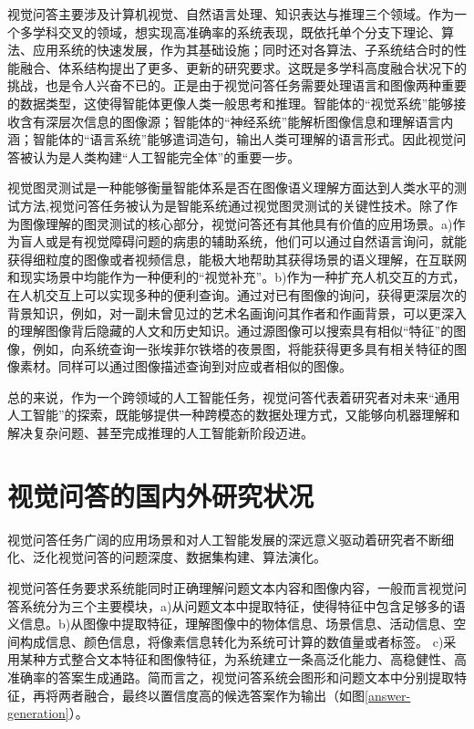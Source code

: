 视觉问答主要涉及计算机视觉、自然语言处理、知识表达与推理三个领域。作为一个多学科交叉的领域，想实现高准确率的系统表现，既依托单个分支下理论、算法、应用系统的快速发展，作为其基础设施；同时还对各算法、子系统结合时的性能融合、体系结构提出了更多、更新的研究要求。这既是多学科高度融合状况下的挑战，也是令人兴奋不已的。正是由于视觉问答任务需要处理语言和图像两种重要的数据类型，这使得智能体更像人类一般思考和推理。智能体的“视觉系统”能够接收含有深层次信息的图像源；智能体的“神经系统”能解析图像信息和理解语言内涵；智能体的“语言系统”能够遣词造句，输出人类可理解的语言形式。因此视觉问答被认为是人类构建“人工智能完全体”的重要一步。

视觉图灵测试是一种能够衡量智能体系是否在图像语义理解方面达到人类水平的测试方法,视觉问答任务被认为是智能系统通过视觉图灵测试的关键性技术。除了作为图像理解的图灵测试的核心部分，视觉问答还有其他具有价值的应用场景。a)作为盲人或是有视觉障碍问题的病患的辅助系统，他们可以通过自然语言询问，就能获得细粒度的图像或者视频信息，能极大地帮助其获得场景的语义理解，在互联网和现实场景中均能作为一种便利的“视觉补充”。b)作为一种扩充人机交互的方式，在人机交互上可以实现多种的便利查询。通过对已有图像的询问，获得更深层次的背景知识，例如，对一副未曾见过的艺术名画询问其作者和作画背景，可以更深入的理解图像背后隐藏的人文和历史知识。通过源图像可以搜索具有相似“特征”的图像，例如，向系统查询一张埃菲尔铁塔的夜景图，将能获得更多具有相关特征的图像素材。同样可以通过图像描述查询到对应或者相似的图像。

总的来说，作为一个跨领域的人工智能任务，视觉问答代表着研究者对未来“通用人工智能”的探索，既能够提供一种跨模态的数据处理方式，又能够向机器理解和解决复杂问题、甚至完成推理的人工智能新阶段迈进。


\section{视觉问答的国内外研究状况}
视觉问答任务广阔的应用场景和对人工智能发展的深远意义驱动着研究者不断细化、泛化视觉问答的问题深度、数据集构建、算法演化。

视觉问答任务要求系统能同时正确理解问题文本内容和图像内容，一般而言视觉问答系统分为三个主要模块，a)从问题文本中提取特征，使得特征中包含足够多的语义信息。b)从图像中提取特征，理解图像中的物体信息、场景信息、活动信息、空间构成信息、颜色信息，将像素信息转化为系统可计算的数值量或者标签。 c)采用某种方式整合文本特征和图像特征，为系统建立一条高泛化能力、高稳健性、高准确率的答案生成通路。简而言之，视觉问答系统会图形和问题文本中分别提取特征，再将两者融合，最终以置信度高的候选答案作为输出（如图\ref{answer-generation}）。

